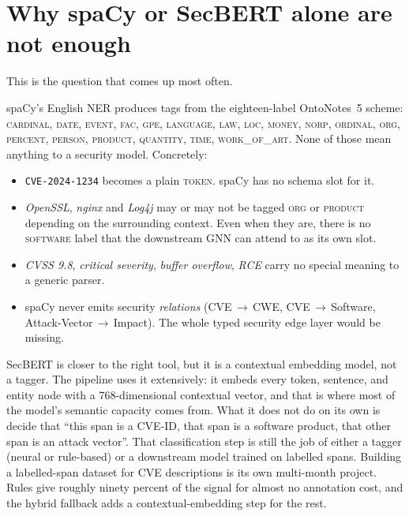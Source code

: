 \documentclass[11pt,a4paper]{article}
\begin{document}
\section{Why spaCy or SecBERT alone are not enough}
\label{sec:why-not-spacy}

This is the question that comes up most often.

spaCy's English NER produces tags from the eighteen-label
OntoNotes~5 scheme: \textsc{cardinal, date, event, fac,
gpe, language, law, loc, money, norp, ordinal, org,
percent, person, product, quantity, time, work\_of\_art}.
None of those mean anything to a security model.
Concretely:

\begin{itemize}[leftmargin=*, itemsep=0pt]
    \item \texttt{CVE-2024-1234} becomes a plain
          \textsc{token}. spaCy has no schema slot for it.
    \item \emph{OpenSSL}, \emph{nginx} and \emph{Log4j} may
          or may not be tagged \textsc{org} or
          \textsc{product} depending on the surrounding
          context. Even when they are, there is no
          \textsc{software} label that the downstream GNN
          can attend to as its own slot.
    \item \emph{CVSS 9.8}, \emph{critical severity},
          \emph{buffer overflow}, \emph{RCE} carry no
          special meaning to a generic parser.
    \item spaCy never emits security \emph{relations}
          (CVE\,$\to$\,CWE, CVE\,$\to$\,Software,
          Attack-Vector\,$\to$\,Impact). The whole typed
          security edge layer would be missing.
\end{itemize}

SecBERT is closer to the right tool, but it is a contextual
embedding model, not a tagger. The pipeline uses it
extensively: it embeds every token, sentence, and entity
node with a 768-dimensional contextual vector, and that is
where most of the model's semantic capacity comes from.
What it does not do on its own is decide that ``this span is
a CVE-ID, that span is a software product, that other span
is an attack vector''. That classification step is still
the job of either a tagger (neural or rule-based) or a
downstream model trained on labelled spans. Building a
labelled-span dataset for CVE descriptions is its own
multi-month project. Rules give roughly ninety percent of
the signal for almost no annotation cost, and the hybrid
fallback adds a contextual-embedding step for the rest.
\end{document}
